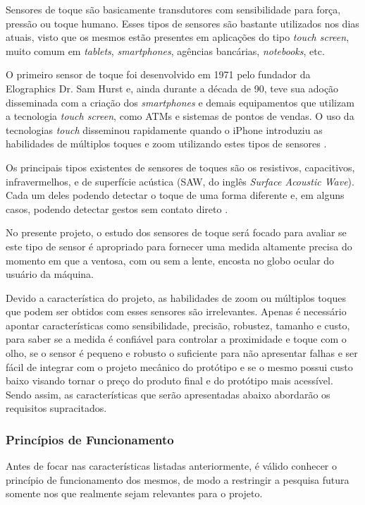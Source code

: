 \begin{anexosenv}
Sensores de toque são basicamente transdutores com sensibilidade para força, pressão ou toque humano. Esses tipos de sensores são bastante utilizados nos dias atuais, visto que os mesmos estão presentes em aplicações do tipo \textit{touch screen}, muito comum em \textit{tablets}, \textit{smartphones}, agências bancárias, \textit{notebooks}, etc.

O primeiro sensor de toque foi desenvolvido em 1971 pelo fundador da Elographics Dr. Sam Hurst e, ainda durante a década de 90, teve sua adoção disseminada com a criação dos \textit{smartphones} e demais equipamentos que utilizam a tecnologia \textit{touch screen}, como ATMs e sistemas de pontos de vendas. O uso da tecnologias \textit{touch} disseminou rapidamente quando o iPhone introduziu as habilidades de múltiplos toques e zoom utilizando estes tipos de sensores \cite{mathas}.

Os principais tipos existentes de sensores de toques são os resistivos, capacitivos, infravermelhos, e de superfície acústica (SAW, do inglês \textit{Surface Acoustic Wave}). Cada um deles podendo detectar o toque de uma forma diferente e, em alguns casos, podendo detectar gestos sem contato direto \cite{mathas}.

No presente projeto, o estudo dos sensores de toque será focado para avaliar se este tipo de sensor é apropriado para fornecer uma medida altamente precisa do momento em que a ventosa, com ou sem a lente, encosta no globo ocular do usuário da máquina. 

Devido a característica do projeto, as habilidades de zoom ou múltiplos toques que podem ser obtidos com esses sensores são irrelevantes. Apenas é necessário apontar características como sensibilidade, precisão, robustez, tamanho e custo, para saber se a medida é confiável para controlar a proximidade e toque com o olho, se o sensor é pequeno e robusto o suficiente para não apresentar falhas e ser fácil de integrar com o projeto mecânico do protótipo e se o mesmo possui custo baixo visando tornar o preço do produto final e do protótipo mais acessível. Sendo assim, as características que serão apresentadas abaixo abordarão os requisitos supracitados.

\subsubsection[Princípios de Funcionamento]{Princípios de Funcionamento}

Antes de focar nas características listadas anteriormente, é válido conhecer o princípio de funcionamento dos mesmos, de modo a restringir a pesquisa futura somente nos que realmente sejam relevantes para o projeto.




\end{anexosenv}

